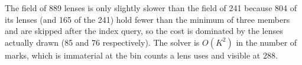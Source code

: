 The field of 889 lenses is only slightly slower than the field of 241 because 804 of its
lenses (and 165 of the 241) hold fewer than the minimum of three members and are
skipped after the index query, so the cost is dominated by the lenses actually
drawn (85 and 76 respectively). The solver
is $O(K^2)$ in the number of marks, which is immaterial at the bin counts a
lens uses and visible at 288.
